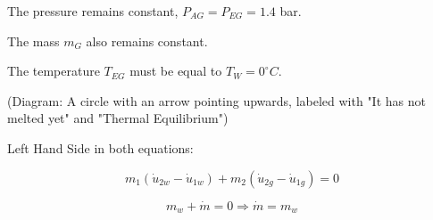 The pressure remains constant, \( P_{AG} = P_{EG} = 1.4 \) bar.

The mass \( m_G \) also remains constant.

The temperature \( T_{EG} \) must be equal to \( T_W = 0^\circ C \).

(Diagram: A circle with an arrow pointing upwards, labeled with "It has not melted yet" and "Thermal Equilibrium")

Left Hand Side in both equations:

\[ m_1 (\dot{u}_{2w} - \dot{u}_{1w}) + m_2 (\dot{u}_{2g} - \dot{u}_{1g}) = 0 \]

\[ m_w + \dot{m} = 0 \Rightarrow \dot{m} = m_w \]